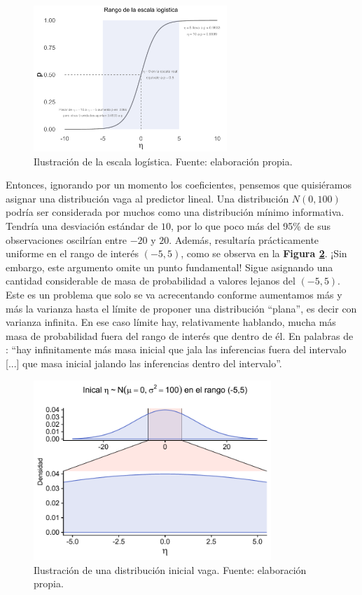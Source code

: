 \begin{figure}
	\centering
	\includegraphics[width = 0.65\textwidth]{Figs/Modelado/Escala_Logis}
	\caption{Ilustración de la escala logística. Fuente: elaboración propia.}
	\label{fig:Escala_Logis}
\end{figure}

Entonces, ignorando por un momento los coeficientes, pensemos que quisiéramos asignar una distribución vaga al predictor lineal. Una distribución $N(0,100)$ podría ser considerada por muchos como una distribución mínimo informativa. Tendría una desviación estándar de $10$, por lo que poco más del 95\% de sus observaciones oscilrían entre $-20$ y $20$. Además, resultaría prácticamente uniforme en el rango de interés $(-5,5)$, como se observa en la \textbf{Figura \ref{fig:Inicial_Vaga}}. ¡Sin embargo, este argumento omite un punto fundamental! Sigue asignando una cantidad considerable de masa de probabilidad a valores lejanos del $(-5,5)$. Este es un problema que solo se va acrecentando conforme aumentamos más y más la varianza hasta el límite de proponer una distribución ``plana'', es decir con varianza infinita. En ese caso límite hay, relativamente hablando, mucha más masa de probabilidad fuera del rango de interés que dentro de él. En palabras de \textcite{BetancourtStanShapePriors}: ``hay infinitamente más masa inicial que jala las inferencias fuera del intervalo [...] que masa inicial jalando las inferencias dentro del intervalo''.\\ 

\begin{figure}[h]
	\centering
	\includegraphics[width = 0.8\textwidth]{Figs/Modelado/Inicial_N_0_100_eta}
	\caption{Ilustración de una distribución inicial vaga. Fuente: elaboración propia.}
	\label{fig:Inicial_Vaga}
\end{figure}

